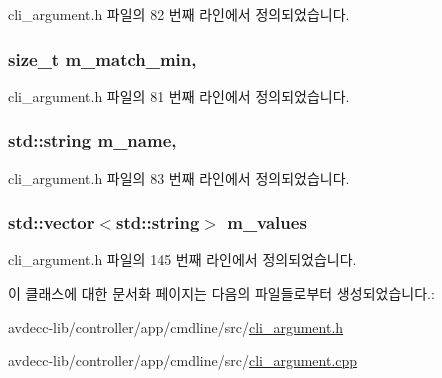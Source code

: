 cli\+\_\+argument.\+h 파일의 82 번째 라인에서 정의되었습니다.

\subsubsection[{\texorpdfstring{m\+\_\+match\+\_\+min}{m_match_min}}]{\setlength{\rightskip}{0pt plus 5cm}size\+\_\+t m\+\_\+match\+\_\+min\hspace{0.3cm}{\ttfamily [protected]}, {\ttfamily [inherited]}}\hypertarget{classcli__argument_a9e9208481670105577821d0a1aee5179}{}\label{classcli__argument_a9e9208481670105577821d0a1aee5179}


cli\+\_\+argument.\+h 파일의 81 번째 라인에서 정의되었습니다.

\subsubsection[{\texorpdfstring{m\+\_\+name}{m_name}}]{\setlength{\rightskip}{0pt plus 5cm}std\+::string m\+\_\+name\hspace{0.3cm}{\ttfamily [protected]}, {\ttfamily [inherited]}}\hypertarget{classcli__argument_adb41893ba19e889e56c559f25fc1a68a}{}\label{classcli__argument_adb41893ba19e889e56c559f25fc1a68a}


cli\+\_\+argument.\+h 파일의 83 번째 라인에서 정의되었습니다.

\subsubsection[{\texorpdfstring{m\+\_\+values}{m_values}}]{\setlength{\rightskip}{0pt plus 5cm}std\+::vector$<$std\+::string$>$ m\+\_\+values\hspace{0.3cm}{\ttfamily [private]}}\hypertarget{classcli__argument__string_a698dcbe3063b2cb63a77b9973fb18dcf}{}\label{classcli__argument__string_a698dcbe3063b2cb63a77b9973fb18dcf}


cli\+\_\+argument.\+h 파일의 145 번째 라인에서 정의되었습니다.



이 클래스에 대한 문서화 페이지는 다음의 파일들로부터 생성되었습니다.\+:\begin{DoxyCompactItemize}
\item 
avdecc-\/lib/controller/app/cmdline/src/\hyperlink{cli__argument_8h}{cli\+\_\+argument.\+h}\item 
avdecc-\/lib/controller/app/cmdline/src/\hyperlink{cli__argument_8cpp}{cli\+\_\+argument.\+cpp}\end{DoxyCompactItemize}
